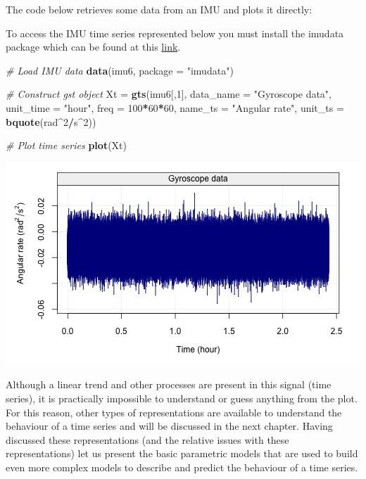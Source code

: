 \documentclass[]{book}
\newenvironment{Shaded}{\begin{snugshade}}{\end{snugshade}}
\newcommand{\KeywordTok}[1]{\textcolor[rgb]{0.13,0.29,0.53}{\textbf{#1}}}
\newcommand{\DataTypeTok}[1]{\textcolor[rgb]{0.13,0.29,0.53}{#1}}
\newcommand{\DecValTok}[1]{\textcolor[rgb]{0.00,0.00,0.81}{#1}}
\newcommand{\StringTok}[1]{\textcolor[rgb]{0.31,0.60,0.02}{#1}}
\newcommand{\CommentTok}[1]{\textcolor[rgb]{0.56,0.35,0.01}{\textit{#1}}}
\newcommand{\OperatorTok}[1]{\textcolor[rgb]{0.81,0.36,0.00}{\textbf{#1}}}
\newcommand{\NormalTok}[1]{#1}
\theoremstyle{definition}
\theoremstyle{definition}
\theoremstyle{definition}
\theoremstyle{remark}
\let\BeginKnitrBlock\begin \let\EndKnitrBlock\end
\begin{document}
The code below retrieves some data from an IMU and plots it directly:

\BeginKnitrBlock{rmdimportant}
To access the IMU time series represented below you must install the
imudata package which can be found at this
\href{https://github.com/SMAC-Group/imudata}{link}.
\EndKnitrBlock{rmdimportant}

\begin{Shaded}
\begin{Highlighting}[]
\CommentTok{# Load IMU data}
\KeywordTok{data}\NormalTok{(imu6, }\DataTypeTok{package =} \StringTok{"imudata"}\NormalTok{)}

\CommentTok{# Construct gst object}
\NormalTok{Xt =}\StringTok{ }\KeywordTok{gts}\NormalTok{(imu6[,}\DecValTok{1}\NormalTok{], }\DataTypeTok{data_name =} \StringTok{"Gyroscope data"}\NormalTok{, }\DataTypeTok{unit_time =} \StringTok{"hour"}\NormalTok{, }
         \DataTypeTok{freq =} \DecValTok{100}\OperatorTok{*}\DecValTok{60}\OperatorTok{*}\DecValTok{60}\NormalTok{, }\DataTypeTok{name_ts =} \StringTok{"Angular rate"}\NormalTok{, }
         \DataTypeTok{unit_ts =} \KeywordTok{bquote}\NormalTok{(rad}\OperatorTok{^}\DecValTok{2}\OperatorTok{/}\NormalTok{s}\OperatorTok{^}\DecValTok{2}\NormalTok{))}

\CommentTok{# Plot time series}
\KeywordTok{plot}\NormalTok{(Xt)}
\end{Highlighting}
\end{Shaded}

\begin{center}\includegraphics{ts_files/figure-latex/example_IMU-1} \end{center}

Although a linear trend and other processes are present in this signal
(time series), it is practically impossible to understand or guess
anything from the plot. For this reason, other types of representations
are available to understand the behaviour of a time series and will be
discussed in the next chapter. Having discussed these representations
(and the relative issues with these representations) let us present the
basic parametric models that are used to build even more complex models
to describe and predict the behaviour of a time series.
\end{document}
